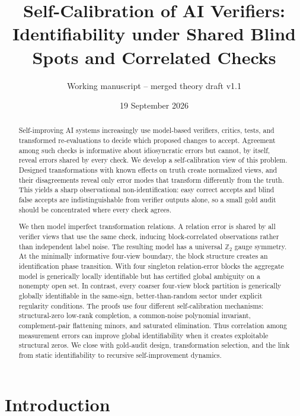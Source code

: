 \documentclass[11pt]{article}
\title{\textbf{Self-Calibration of AI Verifiers:}\\[2pt]
\large Identifiability under Shared Blind Spots and Correlated Checks}
\author{Working manuscript -- merged theory draft v1.1}
\date{19 September 2026}
\theoremstyle{definition}
\theoremstyle{remark}
\newcommand{\Ztwo}{\mathbb{Z}_2}
\begin{document}
\maketitle
\vspace{-1.6em}

\begin{abstract}
Self-improving AI systems increasingly use model-based verifiers, critics, tests, and transformed re-evaluations to decide which proposed changes to accept. Agreement among such checks is informative about idiosyncratic errors but cannot, by itself, reveal errors shared by every check. We develop a self-calibration view of this problem. Designed transformations with known effects on truth create normalized views, and their disagreements reveal only error modes that transform differently from the truth. This yields a sharp observational non-identification: easy correct accepts and blind false accepts are indistinguishable from verifier outputs alone, so a small gold audit should be concentrated where every check agrees.

We then model imperfect transformation relations. A relation error is shared by all verifier views that use the same check, inducing block-correlated observations rather than independent label noise. The resulting model has a universal $\Ztwo$ gauge symmetry. At the minimally informative four-view boundary, the block structure creates an identification phase transition. With four singleton relation-error blocks the aggregate model is generically locally identifiable but has certified global ambiguity on a nonempty open set. In contrast, every coarser four-view block partition is generically globally identifiable in the same-sign, better-than-random sector under explicit regularity conditions. The proofs use four different self-calibration mechanisms: structural-zero low-rank completion, a common-noise polynomial invariant, complement-pair flattening minors, and saturated elimination. Thus correlation among measurement errors can improve global identifiability when it creates exploitable structural zeros. We close with gold-audit design, transformation selection, and the link from static identifiability to recursive self-improvement dynamics.
\end{abstract}

\section{Introduction}
\end{document}
